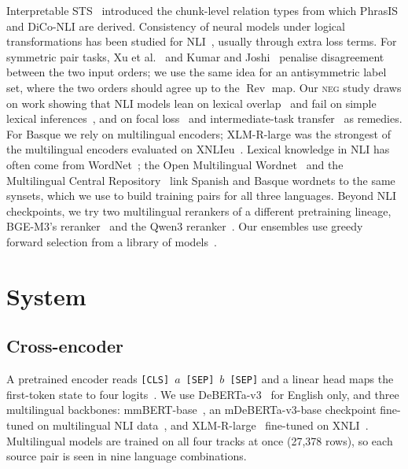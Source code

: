 \documentclass[conference]{IEEEtran}
\newcommand{\rev}{\operatorname{Rev}}
\newcommand{\NEG}{\textsc{neg}}
\begin{document}
Interpretable STS~\cite{lopezgazpio2017ists,semeval2016ists} introduced the
chunk-level relation types from which PhrasIS and DiCo-NLI are derived.
Consistency of neural models under logical transformations has been studied
for NLI~\cite{minervini2018adversarially,li2019logic}, usually through extra
loss terms. For
symmetric pair tasks, Xu et al.~\cite{xu2019symmetric} and Kumar and
Joshi~\cite{kumar2022striking} penalise disagreement between the two input
orders; we use the same idea for an antisymmetric label set, where the two
orders should agree up to the $\rev$ map. Our \NEG{} study draws on work
showing that NLI models lean on lexical overlap~\cite{hans2019} and fail on
simple lexical inferences~\cite{glockner2018breaking}, and on focal
loss~\cite{lin2017focal} and intermediate-task transfer~\cite{pruksachatkun2020intermediate}
as remedies. For Basque we rely on multilingual encoders; XLM-R-large was the
strongest of the multilingual encoders evaluated on XNLIeu~\cite{xnlieu2024}.
Lexical knowledge in NLI has often come from WordNet~\cite{miller1995wordnet};
the Open Multilingual Wordnet~\cite{bond2013omw} and the Multilingual Central
Repository~\cite{gonzalezagirre2012mcr} link Spanish and Basque wordnets to the
same synsets, which we use to build training pairs for all three languages.
Beyond NLI checkpoints, we try two multilingual rerankers of a different
pretraining lineage, BGE-M3's reranker~\cite{chen2024bgem3} and the Qwen3
reranker~\cite{qwen3embedding2025}. Our ensembles use greedy forward selection
from a library of models~\cite{caruana2004ensemble}.

\section{System}

\subsection{Cross-encoder}
A pretrained encoder reads \texttt{[CLS]}~$a$~\texttt{[SEP]}~$b$~\texttt{[SEP]}
and a linear head maps the first-token state to four
logits~\cite{bert2019,wolf2020transformers}. We use
DeBERTa-v3~\cite{deberta2021,debertav3} for English only, and three
multilingual backbones: mmBERT-base~\cite{mmbert2025}, an mDeBERTa-v3-base
checkpoint fine-tuned on multilingual NLI data~\cite{laurer2023universal},
and XLM-R-large~\cite{xlmr2020} fine-tuned on XNLI~\cite{xnli2018,multinli2018}.
Multilingual models are trained on all four tracks at once (27{,}378 rows),
so each source pair is seen in nine language combinations.
\end{document}
